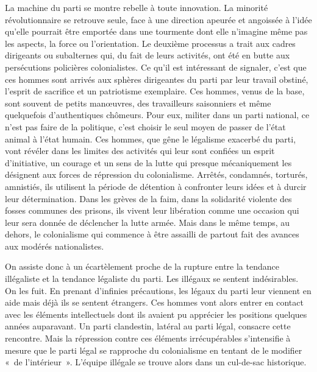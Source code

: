 \documentclass[french,twoside]{book} %
\begin{document}
La machine du parti se montre rebelle à toute innovation. La minorité révolutionnaire se retrouve seule, face à une direction apeurée et angoissée à l’idée qu’elle pourrait être emportée dans une tourmente dont elle n’imagine même pas les aspects, la force ou l’orientation. Le deuxième processus a trait aux cadres dirigeants ou subalternes qui, du fait de leurs activités, ont été en butte aux persécutions policières colonialistes. Ce qu’il est intéressant de signaler, c’est que ces hommes sont arrivés aux   sphères dirigeantes du parti par leur travail obstiné, l’esprit de sacrifice et un patriotisme exemplaire. Ces hommes, venus de la base, sont souvent de petits manœuvres, des travailleurs saisonniers et même quelquefois d’authentiques chômeurs. Pour eux, militer dans un parti national, ce n’est pas faire de la politique, c’est choisir le seul moyen de passer de l’état animal à l’état humain. Ces hommes, que gêne le légalisme exacerbé du parti, vont révéler dans les limites des activités qui leur sont confiées un esprit d’initiative, un courage et un sens de la lutte qui presque mécaniquement les désignent aux forces de répression du colonialisme. Arrêtés, condamnés, torturés, amnistiés, ils utilisent la période de détention à confronter leurs idées et à durcir leur détermination. Dans les grèves de la faim, dans la solidarité violente des fosses communes des prisons, ils vivent leur libération comme une occasion qui leur sera donnée de déclencher la lutte armée. Mais dans le même temps, au dehors, le colonialisme qui commence à être assailli de partout fait des avances aux modérés nationalistes.\par
\bigbreak
\noindent On assiste donc à un écartèlement proche de la rupture entre la tendance illégaliste et la tendance légaliste du parti. Les illégaux se sentent indésirables. On les fuit. En prenant d’infinies précautions, les légaux du parti leur viennent en aide mais déjà ils se sentent étrangers. Ces hommes vont alors entrer en contact avec les éléments intellectuels dont ils avaient pu apprécier les positions quelques années auparavant. Un parti clandestin, latéral au parti légal, consacre cette rencontre. Mais la répression contre ces éléments irrécupérables s’intensifie à mesure que le parti légal se rapproche du colonialisme en tentant de le modifier « de l’intérieur ». L’équipe illégale se trouve alors dans un cul-de-sac historique.\par
\end{document}
